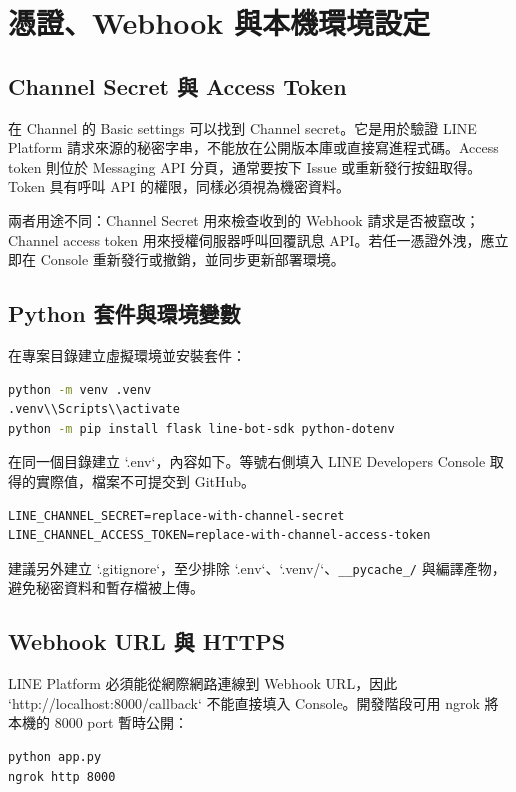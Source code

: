\chapter{憑證、Webhook 與本機環境設定}

\section{Channel Secret 與 Access Token}
在 Channel 的 Basic settings 可以找到 Channel secret。它是用於驗證 LINE Platform 請求來源的秘密字串，不能放在公開版本庫或直接寫進程式碼。Access token 則位於 Messaging API 分頁，通常要按下 Issue 或重新發行按鈕取得。Token 具有呼叫 API 的權限，同樣必須視為機密資料。

兩者用途不同：Channel Secret 用來檢查收到的 Webhook 請求是否被竄改；Channel access token 用來授權伺服器呼叫回覆訊息 API。若任一憑證外洩，應立即在 Console 重新發行或撤銷，並同步更新部署環境。

\section{Python 套件與環境變數}
在專案目錄建立虛擬環境並安裝套件：
\begin{lstlisting}[language=bash,caption={建立 Python 虛擬環境與安裝套件},label={lst:install}]
python -m venv .venv
.venv\\Scripts\\activate
python -m pip install flask line-bot-sdk python-dotenv
\end{lstlisting}

在同一個目錄建立 `.env`，內容如下。等號右側填入 LINE Developers Console 取得的實際值，檔案不可提交到 GitHub。
\begin{lstlisting}[caption={.env 憑證設定範例},label={lst:env}]
LINE_CHANNEL_SECRET=replace-with-channel-secret
LINE_CHANNEL_ACCESS_TOKEN=replace-with-channel-access-token
\end{lstlisting}

建議另外建立 `.gitignore`，至少排除 `.env`、`.venv/`、\texttt{\_\_pycache\_/} 與編譯產物，避免秘密資料和暫存檔被上傳。

\section{Webhook URL 與 HTTPS}
LINE Platform 必須能從網際網路連線到 Webhook URL，因此 `http://localhost:8000/callback` 不能直接填入 Console。開發階段可用 ngrok 將本機的 8000 port 暫時公開：
\begin{lstlisting}[language=bash,caption={使用 ngrok 暫時公開本機服務},label={lst:ngrok}]
python app.py
ngrok http 8000
\end{lstlisting}

